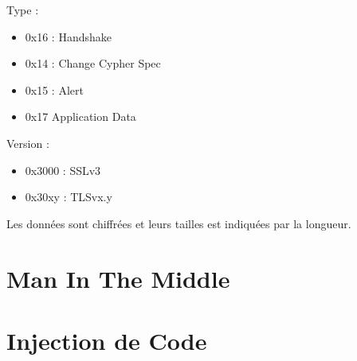 Type :
\begin{itemize}
\item 0x16 : Handshake
\item 0x14 : Change Cypher Spec
\item 0x15 : Alert
\item 0x17 Application Data
\end{itemize}

Version :
\begin{itemize}
\item 0x3000 : SSLv3
\item 0x30xy : TLSvx.y
\end{itemize}

Les données sont chiffrées et leurs tailles est indiquées par
la longueur.

\section{Man In The Middle}
\label{sec:mitm}

\section{Injection de Code}
\label{sec:injCode}





